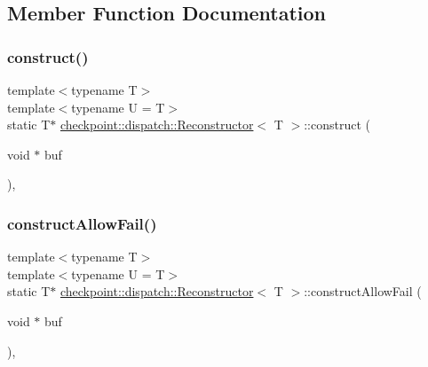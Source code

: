 \subsection{Member Function Documentation}
\mbox{\label{structcheckpoint_1_1dispatch_1_1_reconstructor_a31a927731c0b265003a416e8d20616a1}} 
\subsubsection{\texorpdfstring{construct()}{construct()}}
{\footnotesize\ttfamily template$<$typename T$>$ \\
template$<$typename U  = T$>$ \\
static T$\ast$ \hyperlink{structcheckpoint_1_1dispatch_1_1_reconstructor}{checkpoint\+::dispatch\+::\+Reconstructor}$<$ T $>$\+::construct (\begin{DoxyParamCaption}\item[{void $\ast$}]{buf }\end{DoxyParamCaption})\hspace{0.3cm}{\ttfamily [inline]}, {\ttfamily [static]}}

\mbox{\label{structcheckpoint_1_1dispatch_1_1_reconstructor_afbfa29526948dda3d9d843a377f526fc}} 
\subsubsection{\texorpdfstring{construct\+Allow\+Fail()}{constructAllowFail()}}
{\footnotesize\ttfamily template$<$typename T$>$ \\
template$<$typename U  = T$>$ \\
static T$\ast$ \hyperlink{structcheckpoint_1_1dispatch_1_1_reconstructor}{checkpoint\+::dispatch\+::\+Reconstructor}$<$ T $>$\+::construct\+Allow\+Fail (\begin{DoxyParamCaption}\item[{void $\ast$}]{buf }\end{DoxyParamCaption})\hspace{0.3cm}{\ttfamily [inline]}, {\ttfamily [static]}}

